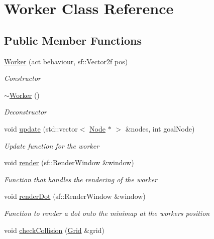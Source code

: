 \hypertarget{class_worker}{}\section{Worker Class Reference}
\label{class_worker}
\subsection*{Public Member Functions}
\begin{DoxyCompactItemize}
\item 
\mbox{\hyperlink{class_worker_ac70dfea860cf30817650e750ed924c08}{Worker}} (act behaviour, sf\+::\+Vector2f pos)
\begin{DoxyCompactList}\small\item\em Constructor \end{DoxyCompactList}\item 
\mbox{\hyperlink{class_worker_aa8e4543ef1e93fd9d884269ba30c5bfe}{$\sim$\+Worker}} ()
\begin{DoxyCompactList}\small\item\em Deconstructor \end{DoxyCompactList}\item 
void \mbox{\hyperlink{class_worker_a6d522360a022f0a94db7e01547c4bcdc}{update}} (std\+::vector$<$ \mbox{\hyperlink{class_node}{Node}} $\ast$ $>$ \&nodes, int goal\+Node)
\begin{DoxyCompactList}\small\item\em Update function for the worker \end{DoxyCompactList}\item 
void \mbox{\hyperlink{class_worker_a18940af5e921feefc2373e120d66ff24}{render}} (sf\+::\+Render\+Window \&window)
\begin{DoxyCompactList}\small\item\em Function that handles the rendering of the worker \end{DoxyCompactList}\item 
void \mbox{\hyperlink{class_worker_a7e1feb9eceef5b8f2cf215e9e1f992f9}{render\+Dot}} (sf\+::\+Render\+Window \&window)
\begin{DoxyCompactList}\small\item\em Function to render a dot onto the minimap at the workers position \end{DoxyCompactList}\item 
void \mbox{\hyperlink{class_worker_a1b3dae07dd02fed908d3864d02f481d8}{check\+Collision}} (\mbox{\hyperlink{class_grid}{Grid}} \&grid)

\end{DoxyCompactItemize}
